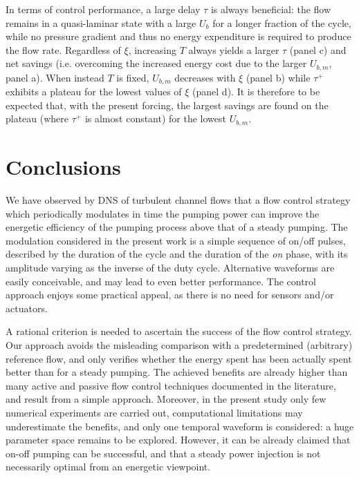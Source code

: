 \documentclass[lineno]{jfm}
\begin{document}
In terms of control performance, a large delay $\tau$ is always beneficial: the flow remains in a quasi-laminar state with a large $U_b$ for a longer fraction of the cycle, while no pressure gradient and thus no energy expenditure is required to produce the flow rate. 
Regardless of $\xi$, increasing $T$ always yields a larger $\tau$ (panel c) and net savings (i.e. overcoming the increased energy cost due to the larger $U_{b,m}$, panel a).
When instead $T$ is fixed, $U_{b,m}$ decreases with $\xi$ (panel b) while $\tau^+$ exhibits a plateau for the lowest values of $\xi$ (panel d).
It is therefore to be expected that, with the present forcing, the largest savings are found on the plateau (where $\tau^+$ is almost constant) for the lowest $U_{b,m}$.

\section{Conclusions}
\label{sec:conclusions}

We have observed by DNS of turbulent channel flows that a flow control strategy which periodically modulates in time the pumping power can improve the energetic efficiency of the pumping process above that of a steady pumping. 
The modulation considered in the present work is a simple sequence of on/off pulses, described by the duration of the cycle and the duration of the \textit{on} phase, with its amplitude varying as the inverse of the duty cycle. Alternative waveforms are easily conceivable, and may lead to even better performance. The control approach enjoys some practical appeal, as there is no need for sensors and/or actuators.

A rational criterion is needed to ascertain the success of the flow control strategy. Our approach avoids the misleading comparison with a predetermined (arbitrary) reference flow, and only verifies whether the energy spent has been actually spent better than for a steady pumping. 
The achieved benefits are already higher than many active and passive flow control techniques documented in the literature, and result from a simple approach.
Moreover, in the present study only few numerical experiments are carried out, computational limitations may underestimate the benefits, and only one temporal waveform is considered: a huge parameter space remains to be explored. 
However, it can be already claimed that on-off pumping can be successful, and that a steady power injection is not necessarily optimal from an energetic viewpoint.
\end{document}
